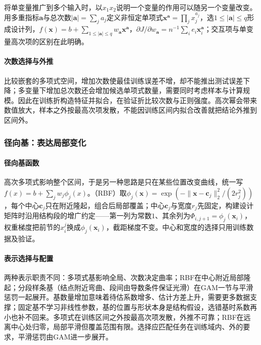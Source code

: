 将单变量推广到多个输入时，以$x_1x_2$说明一个变量的作用可以随另一个变量改变。用多重指标$\bm{a}$与总次数$|\bm{a}|=\sum_ja_j$定义非恒定单项式$\bm{x}^{\bm{a}}=\prod_jx_j^{a_j}$，选$1\le|\bm{a}|\le q$形成设计列，$f(\bm{x})=b+\sum_{1\le|\bm{a}|\le q}w_{\bm{a}}\bm{x}^{\bm{a}}$，$\partial J/\partial w_{\bm{a}}=n^{-1}\sum_i e_i\bm{x}_i^{\bm{a}}$；交互项与单变量高次项的区别在此明确。

\paragraph{次数选择与外推}

比较嵌套的多项式空间，增加次数使最佳训练误差不增，却不能推出测试误差下降；多变量下增加总次数还会增加候选单项式数量，需要同时考虑样本与计算规模。因此在训练折构造特征并拟合，在验证折比较次数与正则强度。高次幂会带来数值放大，样本之外按最高次项发散，不能因训练区间内拟合改善就把结论外推到区间外。

\subsubsection{径向基：表达局部变化}
\label{sec:regression-basis-local}

\paragraph{径向基函数}

高次多项式影响整个区间，于是另一种思路是只在某些位置改变曲线，统一写$f(x)=b+\sum_jw_j\phi_j(x)$。（RBF）取$\phi_j(\bm{x})=\exp(-\lVert\bm{x}-\bm{c}_j\rVert_2^2/(2r_j^2))$，每个中心$\bm{c}_j$只在附近隆起，组合后局部覆盖；中心$\bm{c}_j$与宽度$r_j$先固定，构建设计矩阵时沿用结构段的增广约定——第一列为常数$1$、其余列为$\Phi_{i,j+1}=\phi_j(\bm{x}_i)$，权重梯度把前节的$x_i^j$换成$\phi_j(\bm{x}_i)$，截距梯度不变。中心和宽度的选择只用训练数据及验证。

\paragraph{表示选择与配置}

两种表示职责不同：多项式基影响全局、次数决定曲率；RBF在中心附近局部隆起；分段样条基（结点附近弯曲、段间由导数条件保证光滑）在GAM一节与平滑惩罚一起展开。基数量增加意味着待估系数增多、估计方差上升，需要更多数据支撑；固定基不学习非线性参数，基的位置与形状本身是结构假设，选错基时系数再小也补不回来。多项式在训练区间之外按最高次项发散，外推不可靠；RBF在远离中心处归零，局部平滑但覆盖范围有限。选择应匹配任务在训练域内、外的要求，平滑惩罚由GAM进一步展开。
